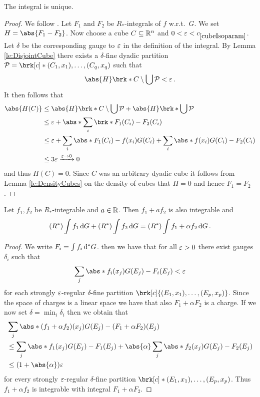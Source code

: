\begin{claim}
The integral is unique.
\end{claim}
\begin{proof}
We follow \cite[Proposition 3.4]{Pfe2016}. Let $F_1$ and $F_2$ be $R_*$-integrals of $f$ w.r.t.\ $G$. We set $H=\abs{F_1-F_2}$. Now choose a cube $C\subseteq \mathbb{R}^n$ and $0<\e<\useconstant{cubeIsoparam}$. Let $\delta$ be the corresponding gauge to $\varepsilon$ in the definition of the integral. By Lemma \ref{le:DisjointCube} there exists a $\delta$-fine dyadic partition $\cP=\brk[c]*{(C_1,x_1),\dots,(C_q,x_q)}$ such that
\begin{align*}
	\abs{H}\brk*{C\setminus \bigcup\cP}<\e\,.
\end{align*}
It then follows that
\begin{align*}
	\abs{H(C)}
	&\leq \abs{H}\brk*{C\setminus \bigcup\cP}+\abs{H}\brk*{\bigcup\cP} \\
	&\leq\e+\abs*{\sum_i\brk*{F_1(C_i)-F_2(C_i)}} \\
	&\leq \e+\sum_i\abs*{F_1(C_i)-f(x_i)G(C_i)} +\sum_i\abs*{f(x_i)G(C_i)-F_2(C_i)} \\
	&\leq 3\e\xrightarrow{\e\to0}0
\end{align*}
and thus $H(C)=0$. Since $C$ was an arbitrary dyadic cube it follows from 
Lemma \ref{le:DensityCubes} on the density of cubes that $H=0$ and hence $F_1=F_2$.

\end{proof}

\begin{claim}
Let $f_1,f_2$ be $R_*$-integrable and $a\in\mathbb{R}$. Then $f_1+af_2$ is also integrable and
\begin{align*}
	(R^*)\int f_1\,\mathrm{d} G + (R^*)\int f_2\,\mathrm{d} G=(R^*)\int f_1+\alpha f_2\,\mathrm{d} G\,.
\end{align*}
\end{claim}

\begin{proof}
We write $F_i=\int f_i\,\mathrm{d} ^*G$. then we have that for all $\varepsilon>0$ there exist gauges $\delta_i$ such that
\begin{align*}
	\sum_j\abs*{f_i(x_j)G(E_j)-F_i(E_j)}<\e
\end{align*}
for each strongly $\varepsilon$-regular $\delta$-fine partition $\brk[c]{(E_1,x_1),\dots,(E_p,x_p)}$. Since the space of charges is a linear space we have that also $F_1+\alpha F_2$ is a charge.
If we now set $\delta=\min_i\delta_i$ then we obtain that
\begin{align*}
	&\sum_j\abs*{(f_1+\alpha f_2)(x_j)G(E_j)-(F_1+\alpha F_2)(E_j)} \\
	&\leq \sum_j\abs*{f_1(x_j)G(E_j)-F_1(E_j)}+\abs{\alpha}\sum_j\abs*{f_2(x_j)G(E_j)-F_2(E_j)} \\
	&\leq (1+\abs{\alpha})\e
\end{align*}
for every strongly $\varepsilon$-regular $\delta$-fine partition $\brk[c]*{(E_1,x_1),\dots,(E_p,x_p)}$. Thus $f_1+\alpha f_2$ is integrable with integral $F_1+\alpha F_2$.
\end{proof}


